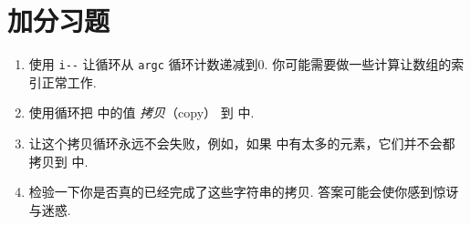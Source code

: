 \section{加分习题}

\begin{enumerate}
\item 使用 \verb|i--| 让循环从 \verb|argc| 循环计数递减到0. 你可能需要做一些计算让数组的索引正常工作.
\item 使用循环把  中的值 \emph{拷贝}（copy） 到  中.
\item 让这个拷贝循环永远不会失败，例如，如果  中有太多的元素，它们并不会都拷贝到  中.
\item 检验一下你是否真的已经完成了这些字符串的拷贝. 答案可能会使你感到惊讶与迷惑.
\end{enumerate}


